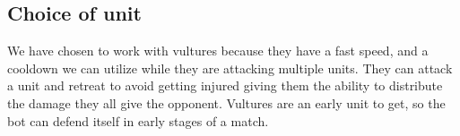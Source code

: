 \subsection{Choice of unit}

We have chosen to work with vultures because they have a fast speed, and a cooldown we can utilize while they are attacking multiple units. They can attack a unit and retreat to avoid getting injured giving them the ability to distribute the damage they all give the opponent. Vultures are an early unit to get, so the bot can defend itself in early stages of a match.
